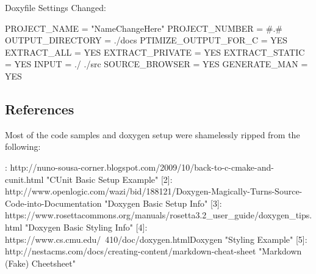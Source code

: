 Doxyfile Settings Changed\+: \begin{DoxyVerb}PROJECT_NAME = "NameChangeHere"
PROJECT_NUMBER = #.#
OUTPUT_DIRECTORY  = ./docs
PTIMIZE_OUTPUT_FOR_C = YES
EXTRACT_ALL = YES
EXTRACT_PRIVATE = YES
EXTRACT_STATIC = YES
INPUT = ./ ./src
SOURCE_BROWSER = YES
GENERATE_MAN = YES
\end{DoxyVerb}


\subsection*{References}

Most of the code samples and doxygen setup were shamelessly ripped from the following\+: \begin{DoxyVerb}[1]: http://nuno-sousa-corner.blogspot.com/2009/10/back-to-c-cmake-and-cunit.html                       "CUnit Basic Setup Example"
[2]: http://www.openlogic.com/wazi/bid/188121/Doxygen-Magically-Turns-Source-Code-into-Documentation    "Doxygen Basic Setup Info"
[3]: https://www.rosettacommons.org/manuals/rosetta3.2_user_guide/doxygen_tips.html                     "Doxygen Basic Styling Info"
[4]: https://www.cs.cmu.edu/~410/doc/doxygen.htmlDoxygen                                                "Styling Example"
[5]: http://nestacms.com/docs/creating-content/markdown-cheat-sheet                                     "Markdown (Fake) Cheetsheet"\end{DoxyVerb}
 